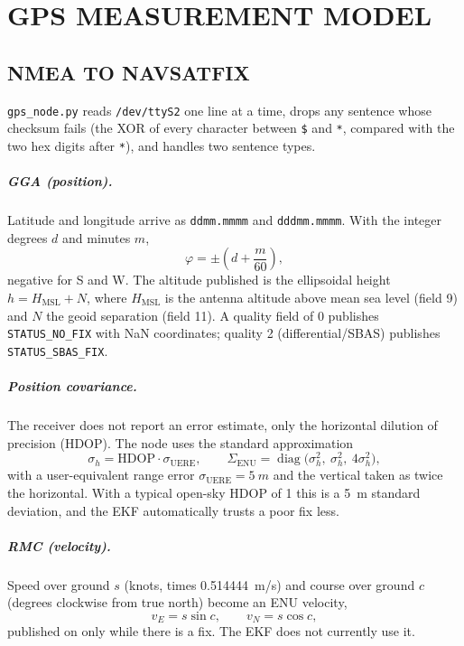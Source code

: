 \chapter{GPS MEASUREMENT MODEL}
\label{ch:gps}

\section{NMEA TO NAVSATFIX}
\label{sec:gpsnode}

\texttt{gps\_node.py} reads \texttt{/dev/ttyS2} one line at a time, drops any
sentence whose checksum fails (the XOR of every character between \texttt{\$}
and \texttt{*}, compared with the two hex digits after \texttt{*}), and handles
two sentence types.

\paragraph{GGA (position).} Latitude and longitude arrive as
\texttt{ddmm.mmmm} and \texttt{dddmm.mmmm}. With the integer degrees $d$ and
minutes $m$,
\begin{equation}
\varphi = \pm\left(d + \frac{m}{60}\right),
\end{equation}
negative for S and W. The altitude published is the ellipsoidal height
$h = H_{\mathrm{MSL}} + N$, where $H_{\mathrm{MSL}}$ is the antenna altitude
above mean sea level (field 9) and $N$ the geoid separation (field 11). A
quality field of 0 publishes \texttt{STATUS\_NO\_FIX} with NaN coordinates;
quality 2 (differential/SBAS) publishes \texttt{STATUS\_SBAS\_FIX}.

\paragraph{Position covariance.} The receiver does not report an error
estimate, only the horizontal dilution of precision (HDOP). The node uses the
standard approximation \cite{misra2006gps}
\begin{equation}\label{eq:gpscov}
\sigma_h = \mathrm{HDOP}\cdot\sigma_{\mathrm{UERE}},\qquad
\Sigma_{\mathrm{ENU}} = \operatorname{diag}\!\bigl(\sigma_h^2,\ \sigma_h^2,\ 4\sigma_h^2\bigr),
\end{equation}
with a user-equivalent range error $\sigma_{\mathrm{UERE}}=\SI{5}{m}$ and the
vertical taken as twice the horizontal. With a typical open-sky HDOP of 1 this
is a \SI{5}{m} standard deviation, and the EKF automatically trusts a poor fix
less.

\paragraph{RMC (velocity).} Speed over ground $s$ (knots, times
\SI{0.514444}{m/s}) and course over ground $c$ (degrees clockwise from true
north) become an ENU velocity,
\begin{equation}
v_E = s\sin c,\qquad v_N = s\cos c,
\end{equation}
published on  only while there is a fix. The EKF does not
currently use it.

